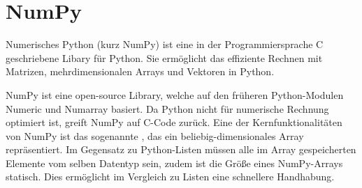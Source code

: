 \section{NumPy}\label{k4.2.ch.NumPy}

Numerisches Python (kurz NumPy) ist eine in der Programmiersprache C geschriebene Libary für Python. Sie ermöglicht das effiziente Rechnen mit Matrizen, mehrdimensionalen Arrays und Vektoren in Python.

NumPy ist eine open-source Library, welche auf den früheren Python-Modulen Numeric und Numarray basiert. Da Python nicht für numerische Rechnung optimiert ist, greift NumPy auf C-Code zurück. Eine der Kernfunktionalitäten von NumPy ist das sogenannte , das ein beliebig-dimensionales Array repräsentiert. Im Gegensatz zu Python-Listen müssen alle im Array gespeicherten Elemente vom selben Datentyp sein, zudem ist die Größe eines NumPy-Arrays statisch. Dies ermöglicht im Vergleich zu Listen eine schnellere Handhabung.

